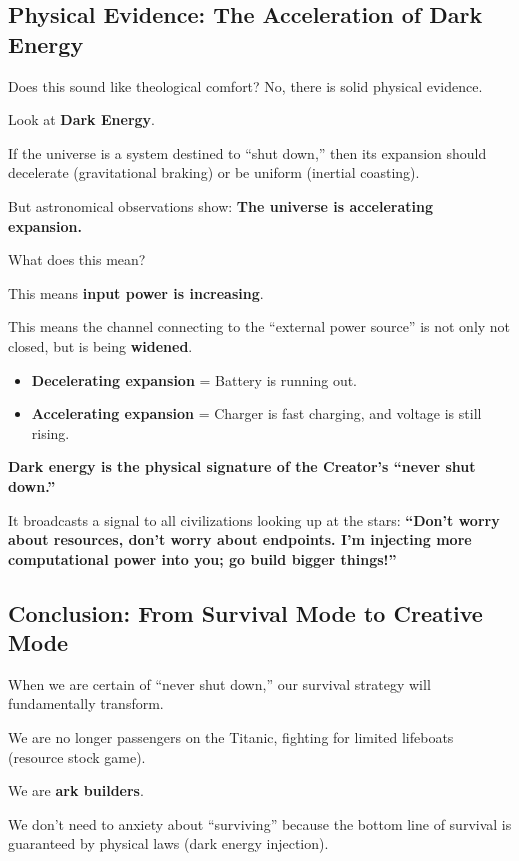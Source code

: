 \subsection{Physical Evidence: The Acceleration of Dark Energy}

Does this sound like theological comfort? No, there is solid physical evidence.

Look at \textbf{Dark Energy}.

If the universe is a system destined to ``shut down,'' then its expansion should decelerate (gravitational braking) or be uniform (inertial coasting).

But astronomical observations show: \textbf{The universe is accelerating expansion.}

What does this mean?

This means \textbf{input power is increasing}.

This means the channel connecting to the ``external power source'' is not only not closed, but is being \textbf{widened}.

\begin{itemize}
\item \textbf{Decelerating expansion} = Battery is running out.

\item \textbf{Accelerating expansion} = Charger is fast charging, and voltage is still rising.
\end{itemize}

\textbf{Dark energy is the physical signature of the Creator's ``never shut down.''}

It broadcasts a signal to all civilizations looking up at the stars: \textbf{``Don't worry about resources, don't worry about endpoints. I'm injecting more computational power into you; go build bigger things!''}

\subsection{Conclusion: From Survival Mode to Creative Mode}

When we are certain of ``never shut down,'' our survival strategy will fundamentally transform.

We are no longer passengers on the Titanic, fighting for limited lifeboats (resource stock game).

We are \textbf{ark builders}.

We don't need to anxiety about ``surviving'' because the bottom line of survival is guaranteed by physical laws (dark energy injection).


